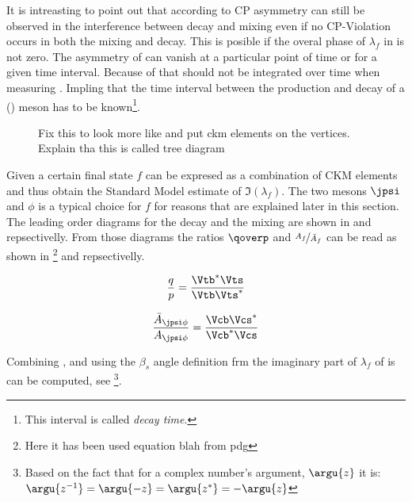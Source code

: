 \noindent It is intreasting to point out that according to  CP asymmetry can still be observed in the interference between decay and
mixing even if no CP-Violation occurs in both the mixing and decay. This is posible if the overal phase of $\lambda_f$ in  is not zero.
The asymmetry of  can vanish at a particular point of time or for a given time interval. Because of that  should not
be integrated over time when measuring \phis. Impling that the time interval between the production and decay of a \Bs (\Bsb) meson has to be
known\footnote{This interval is called {\it decay time}.}.

\begin{figure}[h]
  \centering
  {\sffamily }
  \caption{{\color{red} Fix this to look more like  and put ckm elements on the vertices}. Explain tha this is called tree diagram}
  \label{bs2jpsiphi}
\end{figure}

Given a certain final state $f$  can be expresed as a combination of CKM elements and thus obtain the
Standard Model estimate of $\Im(\lambda_f)$. The two mesons $\jpsi$ and $\phi$ is a typical choice for $f$ for reasons that are
explained later in this section. The leading order diagrams for the \BsJpsiPhi decay and the \BBbarSyst mixing are
shown in  and  repsectivelly. From those diagrams the ratios $\qoverp$ and $\nicefrac{A_f}{\bar{A}_{f}}$
can be read as shown in \footnote{Here it has been used {\color{red} equation blah from pdg} } and  repsectivelly.

\begin{equation}
 \frac{q}{p} = \frac{\Vtb^*\Vts}{\Vtb\Vts^*}
\label{qoverp}
\end{equation}

\begin{equation}
 \frac{\bar{A}_{\jpsi\phi}} {A_{\jpsi\phi}} = \frac{\Vcb\Vcs^*}{\Vcb^*\Vcs}
\label{af_afbar}
\end{equation}

\noindent Combining ,  and using the $\beta_s$ angle definition frm  the imaginary part of
$\lambda_{f}$ of  is can be computed, see \footnote{Based on the fact that for a complex number's argument, $\argu{z}$ it is: $\argu{z^{-1}}=\argu{-z}=\argu{z^*}=-\argu{z}$}.

